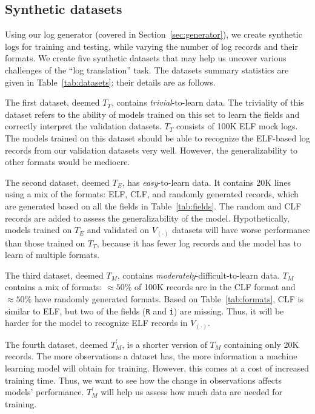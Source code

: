 \documentclass{article}
\begin{document}
\subsection{Synthetic datasets} \label{sec:synth_data}

Using our log generator (covered in Section~\ref{sec:generator}), we create synthetic logs for training and testing, while varying the number of log records and their formats. We create five synthetic datasets that may help us uncover various challenges of the ``log translation'' task. The datasets summary statistics are given in Table~\ref{tab:datasets}; their details are as follows.

The first dataset, deemed $T_T$, contains \textit{trivial}-to-learn data. 
The triviality of this dataset refers to the ability of models trained on this set to learn the fields and correctly interpret the validation datasets. $T_T$ consists of 100K ELF mock logs. The models trained on this dataset should be able to recognize the ELF-based log records from our validation datasets very well. However, the generalizability to other formats would be mediocre.

The second dataset, deemed $T_E$, has \textit{easy}-to-learn data. 
It contains 20K lines using a mix of the formats: ELF, CLF, and randomly generated records, which are generated based on all the fields in Table~\ref{tab:fields}. The random and CLF records are added to assess the generalizability of the model. Hypothetically, models trained on $T_E$ and validated on $V_{(\cdot)}$ datasets will have worse performance than those trained on $T_T$, because it has fewer log records and the model has to learn of multiple formats.

The third dataset, deemed $T_M$, contains \textit{moderately}-difficult-to-learn data.
$T_M$ contains a mix of formats: $\approx 50\%$ of 100K records are in the CLF format and $\approx 50\%$ have randomly generated formats. Based on  Table~\ref{tab:formats},  CLF is similar to ELF, but two of the fields (\texttt{R} and \texttt{i}) are missing. Thus, it will be harder for the model to recognize ELF records in $V_{(\cdot)}$. 

The fourth dataset, deemed $T_M^\prime$, is a shorter version of $T_M$ containing only 20K records. The more observations a dataset has, the more information a machine learning model will obtain for training. However, this comes at a cost of increased training time. Thus, we want to see how the change in observations affects models' performance.
 $T_M^\prime$ will help us assess how much data are needed for training. 
\end{document}
